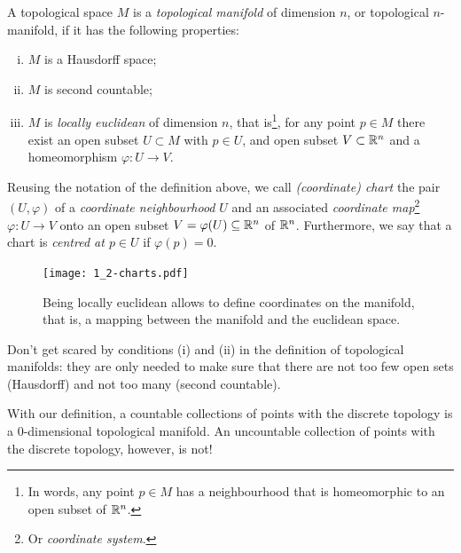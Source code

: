 \begin{definition}
  A topological space $M$ is a \emph{topological manifold} of dimension $n$, or topological $n$-manifold, if it has the following properties:
  \begin{enumerate}[(i)]
    \item $M$ is a Hausdorff space;
    \item $M$ is second countable;
    \item $M$ is \emph{locally euclidean} of dimension $n$, that is\footnote{In words, any point $p\in M$ has a neighbourhood that is homeomorphic to an open subset of $\mathbb{R}^n$.}, for any point $p\in M$ there exist an open subset $U\subset M$ with $p\in U$, and open subset $V\subset\mathbb{R}^n$ and a homeomorphism $\varphi: U\to V$.
  \end{enumerate}
\end{definition}

\begin{notation}
  Reusing the notation of the definition above, we call \emph{(coordinate) chart} the pair $(U, \varphi)$ of a \emph{coordinate neighbourhood} $U$ and an associated \emph{coordinate map}\footnote{Or \emph{coordinate system}.} $\varphi: U\to V$ onto an open subset $V=\varphi(U)\subseteq\mathbb{R}^n$ of $\mathbb{R}^n$.
  Furthermore, we say that a chart is \emph{centred at $p\in U$} if $\varphi(p) = 0$.
\end{notation}

\begin{figure}[htp]
  \centering
  \texttt{[image: 1\_2-charts.pdf]}
  \caption{Being locally euclidean allows to define coordinates on the manifold, that is, a mapping between the manifold and the euclidean space.}
  \label{fig:1.2-charts}
\end{figure}

Don't get scared by conditions (i) and (ii) in the definition of topological manifolds: they are only needed to make sure that there are not too few open sets (Hausdorff) and not too many (second countable).

\begin{example}
  With our definition, a countable collections of points with the discrete topology is a $0$-dimensional topological manifold.
  An uncountable collection of points with the discrete topology, however, is not!
\end{example}

